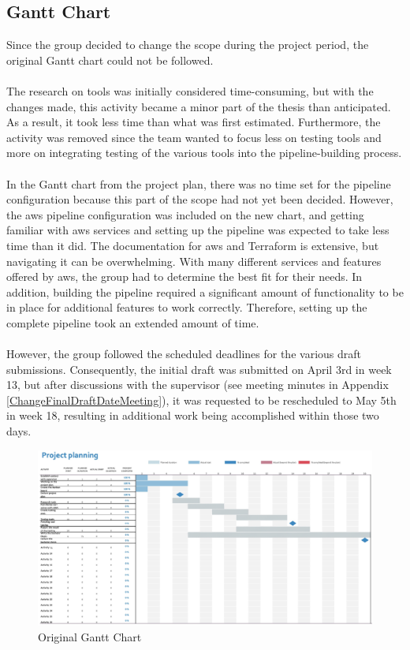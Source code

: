 \subsection{Gantt Chart}
Since the group decided to change the scope during the project period, the original Gantt chart could not be followed. 
\\~\\
The research on tools was initially considered time-consuming, but with the changes made, this activity became a minor part of the thesis than anticipated. As a result, it took less time than what was first estimated. Furthermore, the  activity was removed since the team wanted to focus less on testing tools and more on integrating testing of the various tools into the pipeline-building process. 
\\~\\           
In the Gantt chart from the project plan, there was no time set for the \gls{pipeline} configuration because this part of the scope had not yet been decided. However, the \acrshort{aws} \gls{pipeline} configuration was included on the new chart, and getting familiar with \acrshort{aws} services and setting up the pipeline was expected to take less time than it did. The documentation for \acrshort{aws} and Terraform is extensive, but navigating it can be overwhelming. With many different services and features offered by \acrshort{aws}, the group had to determine the best fit for their needs. In addition, building the \gls{pipeline} required a significant amount of functionality to be in place for additional features to work correctly. Therefore, setting up the complete \gls{pipeline} took an extended amount of time. 
\\~\\
However, the group followed the scheduled deadlines for the various draft submissions. Consequently, the initial draft was submitted on April 3rd in week 13, but after discussions with the supervisor (see meeting minutes in Appendix \ref{ChangeFinalDraftDateMeeting}), it was requested to be rescheduled to May 5th in week 18, resulting in additional work being accomplished within those two days.

\vspace{2mm}
\begin{figure}[H]
    \centering
    \includegraphics[width=1\columnwidth]{Images/gantt2.jpg}
    \caption{Original Gantt Chart}
    \label{fig: Original Gantt Chart}
\end{figure}

